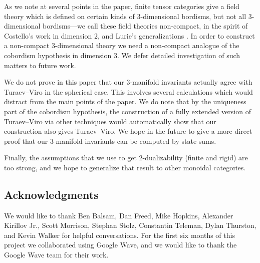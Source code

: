 \documentclass{amsart}
\begin{document}
As we note at several points in the paper, finite tensor categories give a field theory which is defined on certain kinds of $3$-dimensional bordisms, but not all $3$-dimensional bordisms---we call these field theories non-compact, in the spirit of Costello's work \cite{MR2298823} in dimension $2$, and Lurie's generalizations \cite[\S 4.2]{lurie-ch}.  In order to construct a non-compact $3$-dimensional theory we need a non-compact analogue of the cobordism hypothesis in dimension $3$.  We defer detailed investigation of such matters to future work.

We do not prove in this paper that our $3$-manifold invariants actually agree with Turaev--Viro in the spherical case.  This involves several calculations which would distract from the main points of the paper.  We do note that by the uniqueness part of the cobordism hypothesis, the construction of a fully extended version of Turaev--Viro via other techniques would automatically show that our construction also gives Turaev--Viro.  We hope in the future to give a more direct proof that our $3$-manifold invariants can be computed by state-sums. %

Finally, the assumptions that we use to get $2$-dualizability (finite and rigid) are too strong, and we hope to generalize that result to other monoidal categories.

\subsection*{Acknowledgments}

We would like to thank Ben Balsam, Dan Freed, Mike Hopkins, Alexander Kirillov Jr., Scott Morrison, Stephan Stolz, Constantin Teleman, Dylan Thurston, and Kevin Walker for helpful conversations.   For the first six months of this project we collaborated using Google Wave, and we would like to thank the Google Wave team for their work.  
\end{document}
